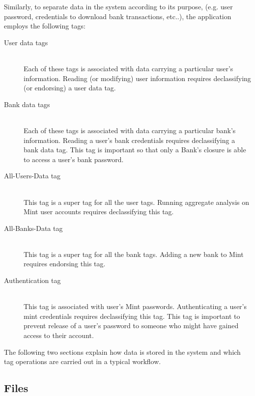 Similarly, to separate data in the system according to its purpose, (e.g. user password, credentials to download bank transactions, etc..), the application employs the following tags:
\begin{description}
  \item[User data tags] \ \\
    Each of these tags is associated with data 
    carrying a particular user's information.
    Reading (or modifying) user information
    requires declassifying (or endorsing)
    a user data tag.
  \item[Bank data tags] \ \\
    Each of these tags is associated 
    with data carrying a particular bank's information.
    Reading a user's bank credentials
    requires declassifying a bank data tag. This tag is
    important so that only a Bank's closure is able
    to access a user's bank password.
  \item[All-Users-Data tag] \ \\ 
    This tag is a super tag for all the user 
    tags.
    Running aggregate analysis on Mint user accounts
    requires declassifying this tag.
  \item[All-Banks-Data tag] \ \\ 
    This tag is a super tag for all the bank tags.
    Adding a new bank to Mint requires endorsing
    this tag.
  \item[Authentication tag] \ \\
    This tag is associated with user's Mint passwords.
    Authenticating a user's mint credentials
    requires declassifying this tag.
    This tag is important to prevent release of
    a user's password to someone who might have
    gained access to their account.
\end{description}

The following two sections explain how data is stored in the system and which tag operations are carried out in a typical workflow.

\subsection{Files}\label{sec:mint-fs}


